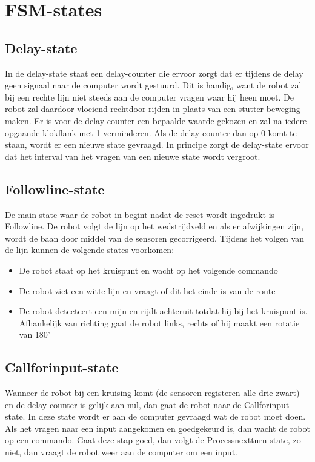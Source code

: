 \documentclass{report}
\begin{document}
\section{FSM-states}

\subsection{Delay-state}
In de delay-state staat een delay-counter die ervoor zorgt dat er tijdens de delay geen signaal naar de computer wordt gestuurd.
Dit is handig, want de robot zal bij een rechte lijn niet steeds aan de computer vragen waar hij heen moet.
De robot zal daardoor vloeiend rechtdoor rijden in plaats van een stutter beweging maken.
Er is voor de delay-counter een bepaalde waarde gekozen en zal na iedere opgaande klokflank met 1 verminderen.
Als de delay-counter dan op 0 komt te staan, wordt er een nieuwe state gevraagd.
In principe zorgt de delay-state ervoor dat het interval van het vragen van een nieuwe state wordt vergroot.


\subsection{Followline-state}
De main state waar de robot in begint nadat de reset wordt ingedrukt is Followline.
De robot volgt de lijn op het wedstrijdveld en als er afwijkingen zijn, wordt de baan door middel van de sensoren gecorrigeerd.
Tijdens het volgen van de lijn kunnen de volgende states voorkomen: 
\begin{itemize}
\item De robot staat op het kruispunt en wacht op het volgende commando
\item De robot ziet een witte lijn en vraagt of dit het einde is van de route
\item De robot detecteert een mijn en rijdt achteruit totdat hij bij het kruispunt is. Afhankelijk van richting gaat de robot links, rechts of hij maakt een rotatie van 180$^\circ$
\end{itemize}

\subsection{Callforinput-state}
Wanneer de robot bij een kruising komt (de sensoren registeren alle drie zwart) en de delay-counter is gelijk aan nul, dan gaat de robot naar de Callforinput-state.
In deze state wordt er aan de computer gevraagd wat de robot moet doen.
Als het vragen naar een input aangekomen en goedgekeurd is, dan wacht de robot op een commando.
Gaat deze stap goed, dan volgt de Processnextturn-state, zo niet, dan vraagt de robot weer aan de computer om een input.
\end{document}
